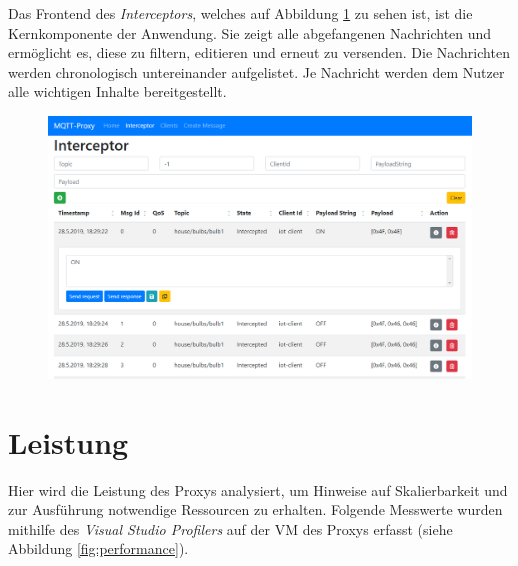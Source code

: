     Das Frontend des \emph{Interceptors}, welches auf Abbildung \ref{fig:frontend_messages} zu sehen ist, ist die Kernkomponente der Anwendung. Sie zeigt alle abgefangenen Nachrichten und ermöglicht es, diese zu filtern, editieren und erneut zu versenden. Die Nachrichten werden chronologisch untereinander aufgelistet. Je Nachricht werden dem Nutzer alle wichtigen Inhalte bereitgestellt.
    \begin{figure}[!h]%
        \centering
        \includegraphics[width=14cm]{tex/bilder/6_validierung/FrontendInterceptor.png}
        \label{fig:frontend_messages}
    \end{figure}

\section{Leistung}
    Hier wird die Leistung des Proxys analysiert, um Hinweise auf Skalierbarkeit und zur Ausführung notwendige Ressourcen zu erhalten.
    Folgende Messwerte wurden mithilfe des \emph{Visual Studio Profilers} auf der \ac{VM} des Proxys erfasst (siehe Abbildung \ref{fig:performance}).
    
